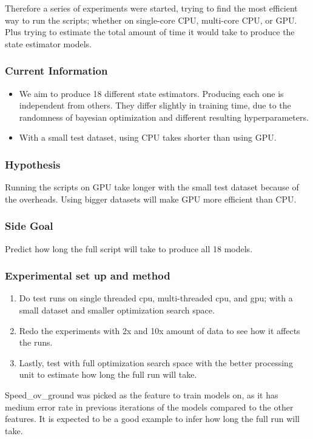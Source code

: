 \documentclass[12pt,twoside]{report}
\begin{document}
Therefore a series of experiments were started, trying to find the most efficient way to run the scripts; whether on single-core CPU, multi-core CPU, or GPU. Plus trying to estimate the total amount of time it would take to produce the state estimator models.

\subsubsection{Current Information}
\begin{itemize}
  \item We aim to produce 18 different state estimators. Producing each one is independent from others. They differ slightly in training time, due to the randomness of bayesian optimization and different resulting hyperparameters.
  \item With a small test dataset, using CPU takes shorter than using GPU.
\end{itemize}

\subsubsection{Hypothesis}
Running the scripts on GPU take longer with the small test dataset because of the overheads. Using bigger datasets will make GPU more efficient than CPU.

\subsubsection{Side Goal}
Predict how long the full script will take to produce all 18 models.

\subsubsection{Experimental set up and method}
\begin{enumerate}
    \item Do test runs on single threaded cpu, multi-threaded cpu, and gpu; with a small dataset and smaller optimization search space.
    \item Redo the experiments with 2x and 10x amount of data to see how it affects the runs.
    \item Lastly, test with full optimization search space with the better processing unit to estimate how long the full run will take.
\end{enumerate}

Speed\_ov\_ground was picked as the feature to train models on, as it has medium error rate in previous iterations of the models compared to the other features. It is expected to be a good example to infer how long the full run will take.
\end{document}
